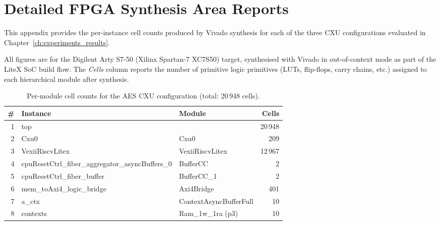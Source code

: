 \chapter{Detailed FPGA Synthesis Area Reports}
\label{app:detailed_tables}

This appendix provides the per-instance cell counts produced by Vivado
synthesis for each of the three CXU configurations evaluated in
Chapter~\ref{ch:experiments_results}.

All figures are for the Digilent Arty S7-50 (Xilinx Spartan-7 XC7S50) target,
synthesised with Vivado in out-of-context mode as part of the LiteX SoC build flow.
The \emph{Cells} column reports the number of primitive logic primitives
(LUTs, flip-flops, carry chains, etc.) assigned to each hierarchical module
after synthesis.

\begin{table}[!htbp]
\centering
\caption{Per-module cell counts for the AES CXU configuration (total: 20\,948 cells).}
\label{tab:area_aes}
\small
\begin{tabular}{rllr}
\toprule
\textbf{\#} & \textbf{Instance} & \textbf{Module} & \textbf{Cells} \\
\midrule
1  & top                                                                 &                                                  & 20\,948 \\
2  & \quad Cxu0                                                          & Cxu0                                             &    209 \\
3  & \quad VexiiRiscvLitex                                               & VexiiRiscvLitex                                  & 12\,967 \\
4  & \quad\quad cpuResetCtrl\_fiber\_aggregator\_asyncBuffers\_0         & BufferCC                                         &      2 \\
5  & \quad\quad cpuResetCtrl\_fiber\_buffer                              & BufferCC\_1                                      &      2 \\
6  & \quad\quad mem\_toAxi4\_logic\_bridge                               & Axi4Bridge                                       &    401 \\
7  & \quad\quad\quad a\_ctx                                              & ContextAsyncBufferFull                           &     10 \\
8  & \quad\quad\quad\quad contexts                                       & Ram\_1w\_1ra (p3)                                &     10 \\

\end{tabular}
\end{table}
